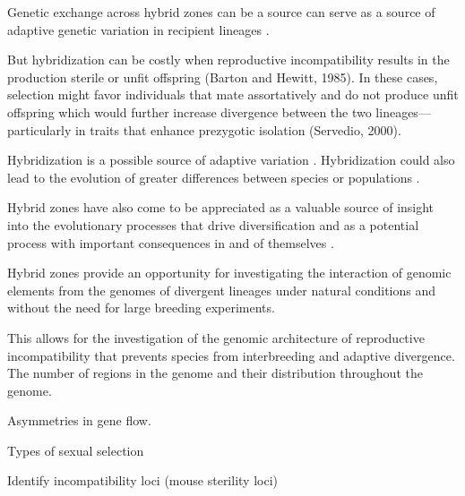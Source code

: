 Genetic exchange across hybrid zones can be a source can serve as a source of adaptive genetic variation in 
recipient lineages \parencite{whitney2010}. 


But hybridization can be costly when 
reproductive incompatibility results in the production sterile or unfit offspring 
(Barton and Hewitt, 1985). In these cases, selection might favor individuals that 
mate assortatively and do not produce unfit offspring which would further increase 
divergence between the two lineages—particularly in traits that enhance prezygotic 
isolation (Servedio, 2000).

Hybridization is a possible source of adaptive variation \citationNeeded.
Hybridization could also lead to the evolution of greater differences between species
or populations \citationNeeded.

Hybrid zones have also come to be appreciated as a valuable source of 
insight into the evolutionary processes that drive diversification and as a potential 
process with important consequences in and of themselves \parencite{barton1985}.

Hybrid zones provide an opportunity for investigating the interaction of 
genomic elements from the genomes of divergent lineages under natural conditions 
and without the need for large breeding experiments.

This allows for the investigation of the genomic architecture of reproductive 
incompatibility that prevents species from interbreeding and adaptive divergence.
The number of regions in the genome and their distribution throughout the genome.

Asymmetries in gene flow. 

Types of sexual selection

Identify incompatibility loci (mouse sterility loci) \parencite{turner2014}




